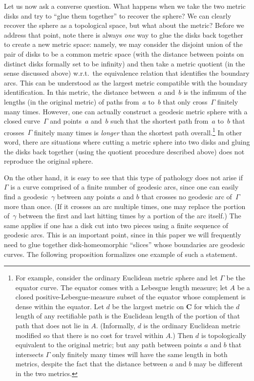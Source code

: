 \documentclass[10pt]{amsart}
\theoremstyle{plain}
\numberwithin{theorem}{section}
\theoremstyle{definition}
\newcommand{\C}{\mathbf{C}}
\begin{document}
Let us now ask a converse question. What happens when we take the two metric disks and try to ``glue them together'' to recover the sphere? We can clearly recover the sphere as a topological space, but what about the metric? Before we address that point, note there is always \emph{one} way to glue the disks back together to create a new metric space: namely, we may consider the disjoint union of the pair of disks to be a common metric space (with the distance between points on distinct disks formally set to be infinity) and then take a metric quotient (in the sense discussed above) w.r.t.\ the equivalence relation that identifies the boundary arcs. This can be understood as the largest metric compatible with the boundary identification. In this metric, the distance between~$a$ and~$b$ is the infimum of the lengths (in the original metric) of paths from~$a$ to~$b$ that only cross~$\Gamma$ finitely many times. However, one can actually construct a geodesic metric sphere with a closed curve~$\Gamma$ and points~$a$ and~$b$ such that the shortest path from~$a$ to~$b$ that crosses~$\Gamma$ finitely many times is \emph{longer} than the shortest path overall.\footnote{For example, consider the ordinary Euclidean metric sphere and let $\Gamma$ be the equator curve. The equator comes with a Lebesgue length measure; let $A$ be a closed positive-Lebesgue-measure subset of the equator whose complement is dense within the equator. Let $d$ be the largest metric on $\C$ for which the $d$ length of any rectifiable path is the Euclidean length of the portion of that path that does not lie in $A$. (Informally, $d$ is the ordinary Euclidean metric modified so that there is no cost for travel within $A$.) Then $d$ is topologically equivalent to the original metric; but any path between points $a$ and $b$ that intersects $\Gamma$ only finitely many times will have the same length in both metrics, despite the fact that the distance between $a$ and $b$ may be different in the two metrics.} In other word, there are situations where cutting a metric sphere into two disks and gluing the disks back together (using the quotient procedure described above) does not reproduce the original sphere.

On the other hand, it is easy to see that this type of pathology does not arise if~$\Gamma$ is a curve comprised of a finite number of geodesic arcs, since one can easily find a geodesic~$\gamma$ between any points $a$ and $b$ that crosses no geodesic arc of~$\Gamma$ more than once. (If it crosses an arc multiple times, one may replace the portion of~$\gamma$ between the first and last hitting times by a portion of the arc itself.) The same applies if one has a disk cut into two pieces using a finite sequence of geodesic arcs. This is an important point, since in this paper we will frequently need to glue together disk-homeomorphic ``slices'' whose boundaries are geodesic curves. The following proposition formalizes one example of such a statement.
\end{document}
